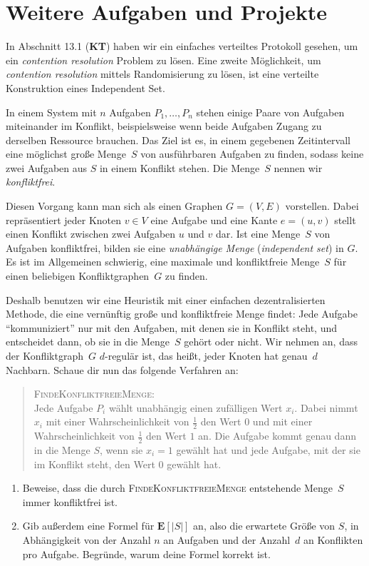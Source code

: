\documentclass{uebung_cs}
\begin{document}
\clearpage
\section*{Weitere Aufgaben und Projekte}

\begin{exercise}
	In Abschnitt 13.1 (\textbf{KT}) haben wir ein einfaches verteiltes Protokoll gesehen, um ein \textit{contention resolution} Problem zu lösen. Eine zweite Möglichkeit, um \textit{contention resolution} mittels Randomisierung zu lösen, ist eine verteilte Konstruktion eines Independent Set.

	In einem System mit $n$ Aufgaben $P_1,\dots,P_n$ stehen einige Paare von Aufgaben miteinander im Konflikt, beispielsweise wenn beide Aufgaben Zugang zu derselben Ressource brauchen. Das Ziel ist es, in einem gegebenen Zeitintervall eine möglichst große Menge~$S$ von ausführbaren Aufgaben zu finden, sodass keine zwei Aufgaben aus $S$ in einem Konflikt stehen. Die Menge~$S$ nennen wir \textit{konfliktfrei}.
	
	Diesen Vorgang kann man sich als einen Graphen $G = (V,E)$ vorstellen. Dabei repräsentiert jeder Knoten $v \in V$ eine Aufgabe und eine Kante $e = (u,v)$ stellt einen Konflikt zwischen zwei Aufgaben $u$ und $v$ dar. Ist eine Menge~$S$ von Aufgaben konfliktfrei, bilden sie eine \emph{unabhängige Menge} (\emph{independent set}) in $G$. 
	Es ist im Allgemeinen schwierig, eine maximale und konfliktfreie Menge~$S$ für einen beliebigen Konfliktgraphen~$G$ zu finden.
	
	Deshalb benutzen wir eine Heuristik mit einer einfachen dezentralisierten Methode, die eine vernünftig große und konfliktfreie Menge findet: Jede Aufgabe \enquote{kommuniziert} nur mit den Aufgaben, mit denen sie in Konflikt steht, und entscheidet dann, ob sie in die Menge~$S$ gehört oder nicht.
	Wir nehmen an, dass der Konfliktgraph~$G$ $d$-regulär ist, das heißt, jeder Knoten hat genau~$d$ Nachbarn. Schaue dir nun das folgende Verfahren an:
	
	\begin{quote}
		\textsc{FindeKonfliktfreieMenge}: \\
		Jede Aufgabe $P_i$ wählt unabhängig einen zufälligen Wert $x_i$. Dabei nimmt $x_i$ mit einer Wahrscheinlichkeit von $\frac{1}{2}$ den Wert $0$ und mit einer Wahrscheinlichkeit von $\frac{1}{2}$ den Wert $1$ an. Die Aufgabe kommt genau dann in die Menge $S$, wenn sie $x_i = 1$ gewählt hat und jede Aufgabe, mit der sie im Konflikt steht, den Wert $0$ gewählt hat.
	\end{quote}
	
		\begin{enumerate}
		\item\medium Beweise, dass die durch \textsc{FindeKonfliktfreieMenge} entstehende Menge~$S$ immer konfliktfrei ist.
		\item\hard Gib außerdem eine Formel für $\mathbf{E}[|S|]$ an, also die erwartete Größe von $S$, in Abhängigkeit von der Anzahl $n$ an Aufgaben und der Anzahl~$d$ an Konflikten pro Aufgabe. Begründe, warum deine Formel korrekt ist.
	\end{enumerate}
\end{exercise}
\end{document}
